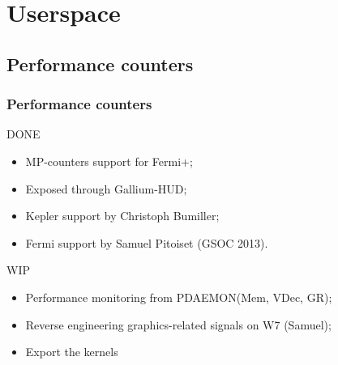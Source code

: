 \documentclass[11pt,english,compress]{beamer}
\begin{document}
\section{Userspace}

\subsection{Performance counters}

\begin{frame}
	\frametitle{Performance counters}

	\begin{block}{DONE}
		\begin{itemize}
			\item MP-counters support for Fermi+;
			\item Exposed through Gallium-HUD;
			\item Kepler support by Christoph Bumiller;
			\item Fermi support by Samuel Pitoiset (GSOC 2013).
		\end{itemize}
	\end{block}

	\begin{block}{WIP}
		\begin{itemize}
			\item Performance monitoring from PDAEMON(Mem, VDec,
GR);
			\item Reverse engineering graphics-related signals on
W7 (Samuel);
			\item Export the kernels
		\end{itemize}
	\end{block}

\end{frame}

\end{document}
